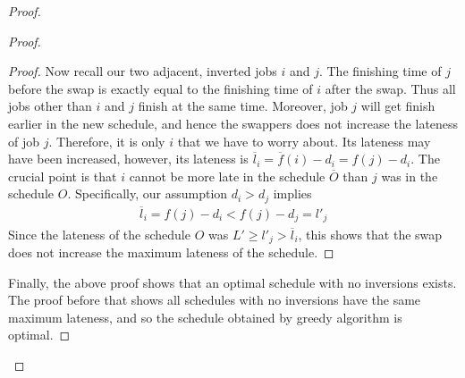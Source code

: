\documentclass[a4paper]{article}
\theoremstyle{plain}
\theoremstyle{definition}
\theoremstyle{remark}
\begin{document}
\begin{proof}
\begin{proof}
\begin{proof}
				Now recall our two adjacent, inverted jobs $i$ and $j$. The finishing time of $j$ before the swap is exactly equal to the finishing time of $i$ after the swap. Thus all jobs other than $i$ and $j$ finish at the same time. Moreover, job $j$ will get finish earlier in the new schedule, and hence the swappers does not increase the lateness of job $j$. Therefore, it is only $i$ that we have to worry about. Its lateness may have been increased, however, its lateness is $\overline{l}_i = \overline{f}(i) - d_i = f(j)-d_i$. The crucial point is that  $i$ cannot be more late in the schedule $\overline{O}$ than $j$ was in the schedule $O$. Specifically, our assumption $d_i>d_j$ implies
				\begin{align*}
					\overline{l}_i = f(j)-d_i < f(j)-d_j = l'_j
				\end{align*}
			Since the lateness of the schedule $O$ was $L'\ge l'_j > \overline{l}_i$, this shows that the swap does not increase the maximum lateness of the schedule.
			\end{proof}
		Finally, the above proof shows that an optimal schedule with no inversions exists. The proof before that shows all schedules with no inversions have the same maximum lateness, and so the schedule obtained by greedy algorithm is optimal.
		\end{proof}
	\end{proof}
\end{document}
